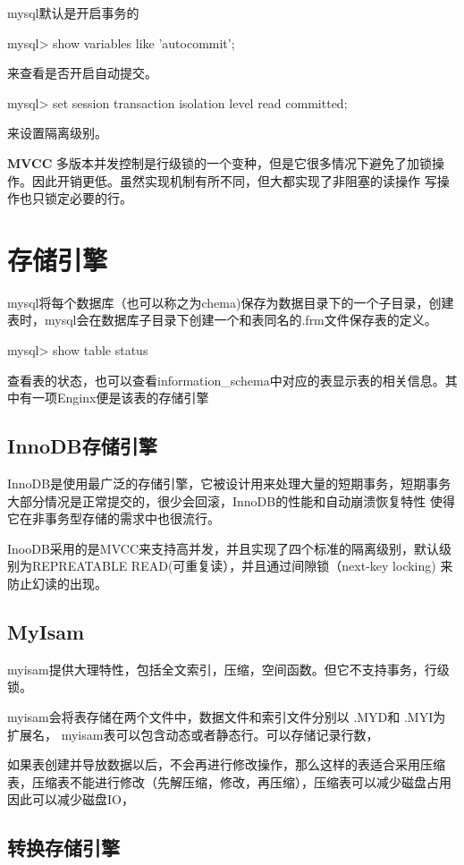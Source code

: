 \documentclass[cyan]{article}
\begin{document}
mysql默认是开启事务的

mysql> show variables like 'autocommit';

来查看是否开启自动提交。

mysql> set session transaction isolation level read committed;

来设置隔离级别。


\textbf{MVCC}
多版本并发控制是行级锁的一个变种，但是它很多情况下避免了加锁操作。因此开销更低。虽然实现机制有所不同，但大都实现了非阻塞的读操作
写操作也只锁定必要的行。

\section{存储引擎}

mysql将每个数据库（也可以称之为chema)保存为数据目录下的一个子目录，创建表时，mysql会在数据库子目录下创建一个和表同名的.frm文件保存表的定义。

mysql> show table status

查看表的状态，也可以查看information_schema中对应的表显示表的相关信息。其中有一项Enginx便是该表的存储引擎

\subsection{InnoDB存储引擎}

InnoDB是使用最广泛的存储引擎，它被设计用来处理大量的短期事务，短期事务大部分情况是正常提交的，很少会回滚，InnoDB的性能和自动崩溃恢复特性
使得它在非事务型存储的需求中也很流行。

InooDB采用的是MVCC来支持高并发，并且实现了四个标准的隔离级别，默认级别为REPREATABLE READ(可重复读），并且通过间隙锁（next-key locking)
来防止幻读的出现。

\subsection{MyIsam}

myisam提供大理特性，包括全文索引，压缩，空间函数。但它不支持事务，行级锁。

myisam会将表存储在两个文件中，数据文件和索引文件分别以 .MYD和 .MYI为扩展名， myisam表可以包含动态或者静态行。可以存储记录行数，

如果表创建并导放数据以后，不会再进行修改操作，那么这样的表适合采用压缩表，压缩表不能进行修改（先解压缩，修改，再压缩），压缩表可以减少磁盘占用
因此可以减少磁盘IO，


\subsection{转换存储引擎}
\end{document}
